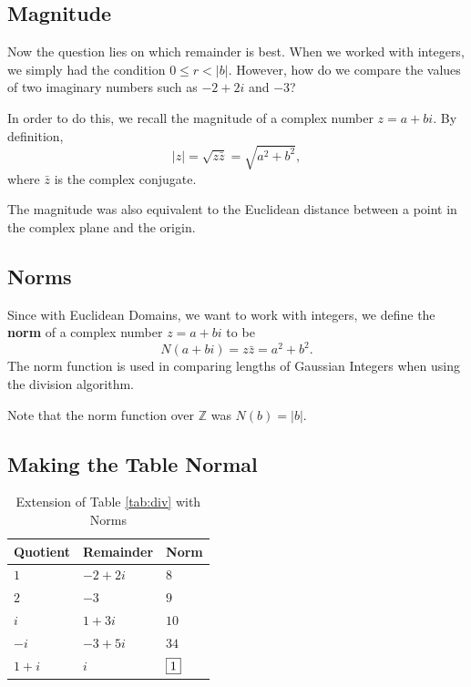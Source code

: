 \subsection*{Magnitude} 

Now the question lies on which remainder is best. When we worked with integers, we simply had the condition $0\le r<|b|$. However, how do we compare the values of two imaginary numbers such as $-2+2i$ and $-3$?  

In order to do this, we recall the magnitude of a complex number $z=a+bi$. By definition, $$|z|=\sqrt{z\bar{z}}=\sqrt{a^2+b^2},$$ where $\bar{z}$ is the complex conjugate.  

The magnitude was also equivalent to the Euclidean distance between a point in the complex plane and the origin.

\subsection{Norms}

Since with Euclidean Domains, we want to work with integers, we define the \textbf{norm} of a complex number $z=a+bi$ to be $$N(a+bi)=z\bar{z}=a^2+b^2.$$  
The norm function is used in comparing lengths of Gaussian Integers when using the division algorithm.  

Note that the norm function over $\mathbb{Z}$ was $N(b)=|b|$.  

\clearpage

\subsection*{Making the Table Normal}


\begin{table}[h]
	\centering
	\begin{tabular}{l l l }
		\toprule
		Quotient & Remainder & Norm \\
		\midrule
		$1$ & $-2+2i$ & $8$ \\
		$2$ & $-3$ & $9$  \\ 
		$i$ & $1+3i$ & $10$ \\
		$-i$ & $-3+5i$ & $34$\\
		$1+i$ & $i$ & $\framebox{1}$ \\ 
		\bottomrule
	\end{tabular}
	\caption{Extension of Table \ref{tab:div} with Norms}
\end{table}

\clearpage


